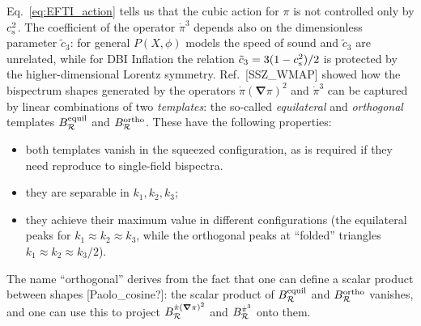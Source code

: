 \documentclass[aps,prd,amsmath,floats,floatfix,superscriptaddress,nofootinbib%
]{revtex4}%
\renewcommand\({\left(}
\renewcommand\){\right)}
\renewcommand\[{\left[}
\renewcommand\]{\right]}
\renewcommand{\vec}{\bm}
\begin{document}
Eq.~\eqref{eq:EFTI_action} tells us that the cubic action for $\pi$ is not controlled only by $c^2_{\rm s}$. 
The coefficient of the operator ${\dot\pi}^3$ depends also on the dimensionless parameter $\tilde{c}_3$: 
for general $P(X,\phi)$ models the speed of sound %
and %
$\tilde{c}_3$ are unrelated, 
while for DBI Inflation the relation $\tilde{c}_3 = 3({1-c^2_{\rm s}})/2$ is protected by the higher-dimensional Lorentz symmetry. 
Ref.~[SSZ\_WMAP] showed how the bispectrum shapes generated by the operators $\dot{\pi}(\vec{\nabla}\pi)^2$ and $\dot{\pi}^3$ can be captured 
by linear combinations of two \emph{templates}: the so-called \emph{equilateral} and \emph{orthogonal} templates $B_{\cal R}^{\rm equil}$ and $B_{\cal R}^{\rm ortho}$. These have the following properties: 
\begin{itemize}[leftmargin=*]
\item both templates vanish in the squeezed configuration, as is required if they need reproduce to single-field bispectra. 
\item they are separable in $k_1,k_2,k_3$; 
\item they achieve their maximum value in different configurations (the equilateral peaks for $k_1\approx k_2\approx k_3$, while the orthogonal peaks at ``folded'' triangles $k_1\approx k_2\approx k_3/2$). 
\end{itemize} 
The name ``orthogonal'' derives from the fact that one can define a scalar product between shapes [Paolo\_cosine?]: the scalar product of $B_{\cal R}^{\rm equil}$ and $B_{\cal R}^{\rm ortho}$ vanishes, and one can use this to project $B_{\cal R}^{\dot{\pi}(\vec{\nabla}\pi)^2}$ and $B_{\cal R}^{\dot{\pi}^3}$ onto them. 
\end{document}
